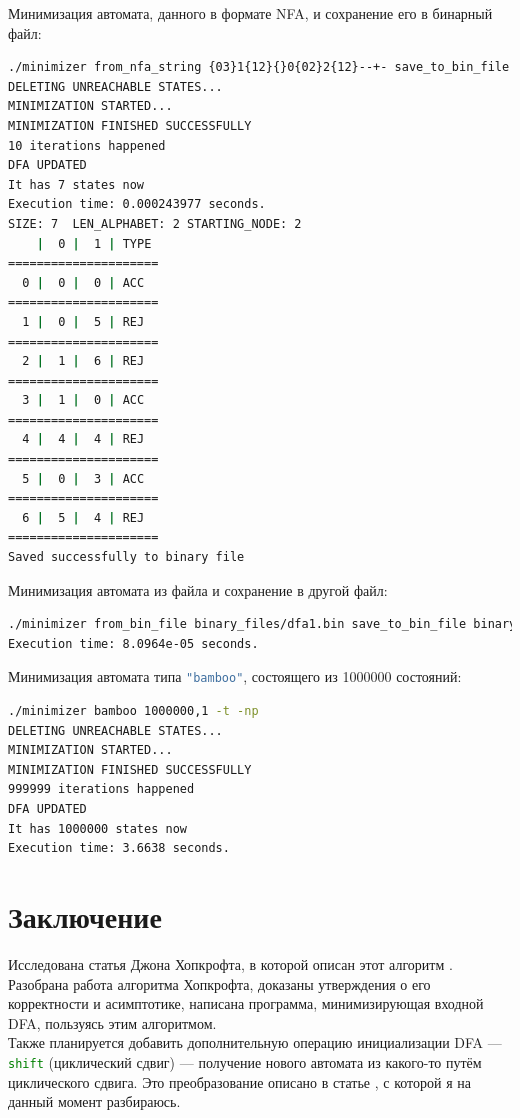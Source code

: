 \documentclass{article}
\begin{document}
Минимизация автомата, данного в формате NFA, и сохранение его в бинарный файл:
\begin{lstlisting}[language=bash]
./minimizer from_nfa_string {03}1{12}{}0{02}2{12}--+- save_to_bin_file binary_files/dfa0.bin -t
DELETING UNREACHABLE STATES...
MINIMIZATION STARTED...
MINIMIZATION FINISHED SUCCESSFULLY
10 iterations happened
DFA UPDATED
It has 7 states now
Execution time: 0.000243977 seconds.
SIZE: 7  LEN_ALPHABET: 2 STARTING_NODE: 2
    |  0 |  1 | TYPE 
=====================
  0 |  0 |  0 | ACC
=====================
  1 |  0 |  5 | REJ
=====================
  2 |  1 |  6 | REJ
=====================
  3 |  1 |  0 | ACC
=====================
  4 |  4 |  4 | REJ
=====================
  5 |  0 |  3 | ACC
=====================
  6 |  5 |  4 | REJ
=====================
Saved successfully to binary file
\end{lstlisting}
Минимизация автомата из файла и сохранение в другой файл:
\begin{lstlisting}[language=bash]
./minimizer from_bin_file binary_files/dfa1.bin save_to_bin_file binary_files/dfa2.bin -t -np -nd
Execution time: 8.0964e-05 seconds.
\end{lstlisting}
Минимизация автомата типа \lstinline[language=bash]!"bamboo"!, состоящего из 1000000 состояний:
\begin{lstlisting}[language=bash]
./minimizer bamboo 1000000,1 -t -np
DELETING UNREACHABLE STATES...
MINIMIZATION STARTED...
MINIMIZATION FINISHED SUCCESSFULLY
999999 iterations happened
DFA UPDATED
It has 1000000 states now
Execution time: 3.6638 seconds.
\end{lstlisting}
\section{Заключение}
Исследована статья Джона Хопкрофта, в которой описан этот алгоритм \cite{hopcroft1971n}.\\
Разобрана работа алгоритма Хопкрофта, доказаны утверждения о его корректности и асимптотике, написана программа, минимизирующая входной DFA, пользуясь этим алгоритмом.\\
Также планируется добавить дополнительную операцию инициализации DFA --- \lstinline[language=bash]!shift! (циклический сдвиг) --- получение нового автомата из какого-то путём циклического сдвига. Это преобразование описано в статье \cite{shift2008}, с которой я на данный момент разбираюсь.


\end{document}
